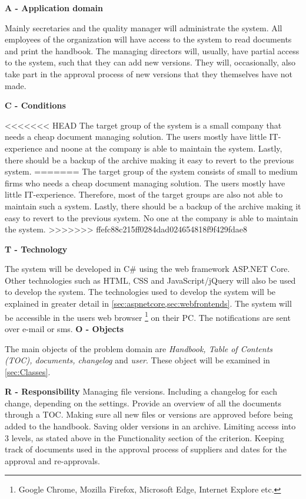 \textbf{A - Application domain}

Mainly secretaries and the quality manager will administrate the system.
All employees of the organization will have access to the system to read documents and print the handbook.
The managing directors will, usually, have partial access to the system, such that they can add new versions.
They will, occasionally, also take part in the approval process of new versions that they themselves have not made.

\textbf{C - Conditions} \label{sec:conditions}

<<<<<<< HEAD
The target group of the system is a small company that needs a cheap document managing solution.
The users mostly have little IT-experience and noone at the company is able to maintain the system.
Lastly, there should be a backup of the archive making it easy to revert to the previous system.
=======
The target group of the system consists of small to medium firms who needs a cheap document managing solution.
The users mostly have little IT-experience.
Therefore, most of the target groups are also not able to maintain such a system.
Lastly, there should be a backup of the archive making it easy to revert to the previous system.
No one at the company is able to maintain the system.
>>>>>>> ffefc88c215ff0284dad024654818f9f429fdae8

\textbf{T - Technology}

The system will be developed in C\# using the web framework ASP.NET Core.
Other technologies such as HTML, CSS and JavaScript/jQuery will also be used to develop the system.
The technologies used to develop the system will be explained in greater detail in \cref{sec:aspnetcore,sec:webfrontends}.
The system will be accessible in the users web browser \footnote{Google Chrome, Mozilla Firefox, Microsoft Edge, Internet Explore etc.} on their PC.
The notifications are sent over e-mail or sms.
\textbf{O - Objects}

The main objects of the problem domain are \textit{Handbook, Table of Contents (TOC), documents, changelog} and \textit{user}.
These object will be examined in \cref{sec:Classes}.

\textbf{R  - Responsibility}
Managing file versions.
Including a changelog for each change, depending on the settings.
Provide an overview of all the documents through a TOC.
Making sure all new files or versions are approved before being added to the handbook.
Saving older versions in an archive.
Limiting access into 3 levels, as stated above in the Functionality section of the criterion.
Keeping track of documents used in the approval process of suppliers and dates for the approval and re-approvals.

